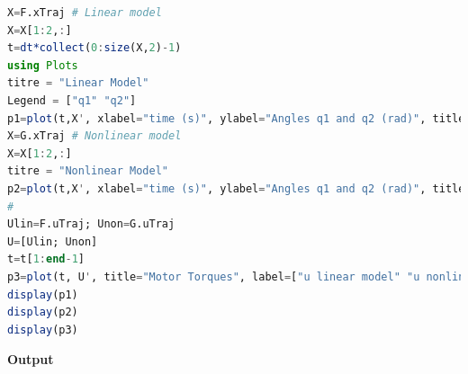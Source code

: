 \begin{lstlisting}[language=Julia,style=mystyle]
X=F.xTraj # Linear model
X=X[1:2,:]
t=dt*collect(0:size(X,2)-1)
using Plots
titre = "Linear Model"
Legend = ["q1" "q2"]
p1=plot(t,X', xlabel="time (s)", ylabel="Angles q1 and q2 (rad)", title=titre, label = Legend)
X=G.xTraj # Nonlinear model
X=X[1:2,:]
titre = "Nonlinear Model"
p2=plot(t,X', xlabel="time (s)", ylabel="Angles q1 and q2 (rad)", title=titre, label = Legend)
#
Ulin=F.uTraj; Unon=G.uTraj
U=[Ulin; Unon] 
t=t[1:end-1]
p3=plot(t, U', title="Motor Torques", label=["u linear model" "u nonlinear model"])
display(p1)
display(p2)
display(p3)
\end{lstlisting}
\textbf{Output} 
\begin{figure}[htb!]%
\centering
{}
\hspace{20pt }%
\hspace{20pt }%



\end{figure}
